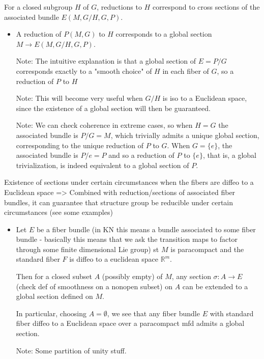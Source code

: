 \documentclass{report}
\theoremstyle{definition}
\begin{document}
For a closed subgroup $H$ of $G$, reductions to $H$ correspond to cross sections of the associated bundle $E(M,G/H,G,P)$. 
\begin{itemize}
    \item A reduction of $P(M,G)$ to $H$ corresponds to a global section $M\to E(M,G/H,G,P)$.

    Note: The intuitive explanation is that a global section of $E=P/G$ corresponds exactly to a "smooth choice" of $H$ in each fiber of $G$, so a reduction of $P$ to $H$

    Note: This will become very useful when $G/H$ is iso to a Euclidean space, since the existence of a global section will then be guaranteed.

    Note: We can check coherence in extreme cases, so when $H=G$ the associated bundle is $P/G=M$, which trivially admits a unique global section, corresponding to the unique reduction of $P$ to $G$. When $G=\{e\}$, the associated bundle is $P/e=P$ and so a reduction of $P$ to $\{e\}$, that is, a global trivialization, is indeed equivalent to a global section of $P$.
\end{itemize}

Existence of sections under certain circumstances when the fibers are diffeo to a Euclidean space => Combined with reduction/sections of associated fiber bundles, it can guarantee that structure group be reducible under certain circumstances (see some examples)
\begin{itemize}
    \item Let $E$ be a fiber bundle (in KN this means a bundle associated to some fiber bundle - basically this means that we ask the transition maps to factor through some finite dimensional Lie group) st $M$ is paracompact and the standard fiber $F$ is diffeo to a euclidean space $\mathbb{R}^m$.

    Then for a closed subset $A$ (possibly empty) of $M$, any section $\sigma:A\to E$ (check def of smoothness on a nonopen subset) on $A$ can be extended to a global section defined on $M$.

    In particular, choosing $A=\emptyset$, we see that any fiber bundle $E$ with standard fiber diffeo to a Euclidean space over a paracompact mfd admits a global section.

    Note: Some partition of unity stuff.
\end{itemize}
\end{document}
